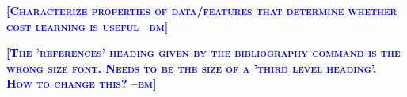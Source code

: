 \documentclass{article} %
\newcommand{\bmcomment}[1]{\textcolor{blue}{\textsc{\textbf{[#1 --bm]}}}}
\begin{document}
\bmcomment{Characterize properties of data/features that determine 
whether cost learning is useful}



\bmcomment{The 'references' heading given by the 
bibliography command is the wrong size font.  Needs to
be the size of a 'third level heading'.  How to change this?}



%
%


\end{document}
